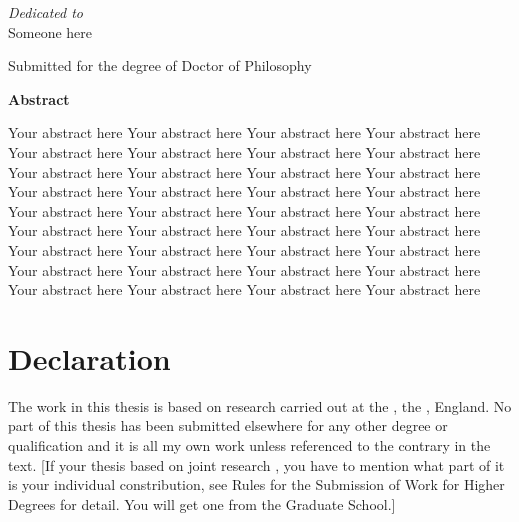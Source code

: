 \newpage
\thispagestyle{empty}
\begin{center}
 \vspace*{2cm}
  \textit{\LARGE {Dedicated to}}\\ 
 Someone here
\end{center}


\newpage
\thispagestyle{empty}
\begin{center}
  \textbf{\Large \thesisTitle}

  \vspace*{1cm}
  \textbf{\large \authorLi}

  \vspace*{0.5cm}
  {\large Submitted for the degree of Doctor of Philosophy\\ \monthAndYear}

  \vspace*{1cm}
  \textbf{\large Abstract}
\end{center}
Your abstract here Your abstract here Your abstract here Your abstract here
Your abstract here Your abstract here Your abstract here Your abstract here
Your abstract here Your abstract here Your abstract here Your abstract here
Your abstract here Your abstract here Your abstract here Your abstract here
Your abstract here Your abstract here Your abstract here Your abstract here
Your abstract here Your abstract here Your abstract here Your abstract here
Your abstract here Your abstract here Your abstract here Your abstract here
Your abstract here Your abstract here Your abstract here Your abstract here
Your abstract here Your abstract here Your abstract here Your abstract here

\chapter*{Declaration}
The work in this thesis is based on research carried out at the \resGroup, the \institute, England. No part of this thesis has been submitted elsewhere for any other degree or qualification and it is all
my own work unless referenced to the contrary in the text. [If your thesis based on joint research , you have to mention what part of it is your individual constribution, see Rules for the Submission of Work for Higher Degrees for detail. You will get one from the Graduate School.]



